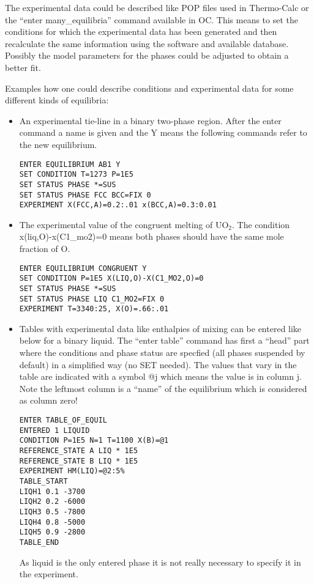 \documentclass[12pt]{article}
\begin{document}
The experimental data could be described like POP files used in
Thermo-Calc or the ``enter many\_equilibria'' command available in OC.
This means to set the conditions for which the experimental data has
been generated and then recalculate the same information using the
software and available database.  Possibly the model parameters for
the phases could be adjusted to obtain a better fit.

Examples how one could describe
conditions and experimental data for some different kinds of equilibria:
\begin{itemize}
\item An experimental tie-line in a binary two-phase region. After the
  enter command a name is given and the Y means the following commands
  refer to the new equilibrium.
\begin{verbatim}
ENTER EQUILIBRIUM AB1 Y
SET CONDITION T=1273 P=1E5
SET STATUS PHASE *=SUS
SET STATUS PHASE FCC BCC=FIX 0
EXPERIMENT X(FCC,A)=0.2:.01 x(BCC,A)=0.3:0.01
\end{verbatim}

\item The experimental value of the congruent melting of UO$_2$.  The
  condition x(liq,O)-x(C1\_mo2)=0 means both phases should have the
  same mole fraction of O.
\begin{verbatim}
ENTER EQUILIBRIUM CONGRUENT Y
SET CONDITION P=1E5 X(LIQ,O)-X(C1_MO2,O)=0
SET STATUS PHASE *=SUS
SET STATUS PHASE LIQ C1_MO2=FIX 0
EXPERIMENT T=3340:25, X(O)=.66:.01
\end{verbatim}

\item Tables with experimental data like enthalpies of mixing can be
  entered like below for a binary liquid.  The ``enter table'' command
  has first a ``head'' part where the conditions and phase status are
  specfied (all phases suspended by default) in a simplified way (no
  SET needed).  The values that vary in the table are indicated with a
  symbol @j which means the value is in column j.  Note the leftmost
  column is a ``name'' of the equilibrium which is considered as
  column zero!
\begin{verbatim}
ENTER TABLE_OF_EQUIL
ENTERED 1 LIQUID
CONDITION P=1E5 N=1 T=1100 X(B)=@1
REFERENCE_STATE A LIQ * 1E5
REFERENCE_STATE B LIQ * 1E5
EXPERIMENT HM(LIQ)=@2:5%
TABLE_START
LIQH1 0.1 -3700 
LIQH2 0.2 -6000
LIQH3 0.5 -7800 
LIQH4 0.8 -5000 
LIQH5 0.9 -2800 
TABLE_END
\end{verbatim}
As liquid is the only entered phase it is not really necessary to
specify it in the experiment.

\end{itemize}
\end{document}
